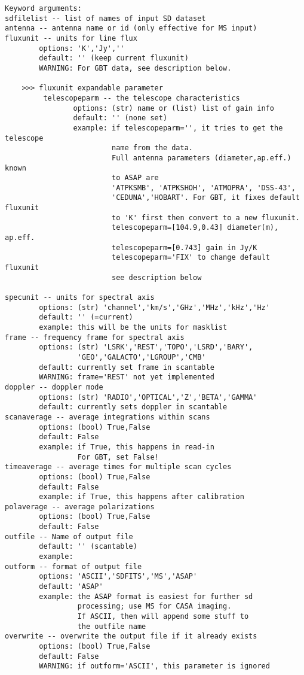 \begin{verbatim}
Keyword arguments:
sdfilelist -- list of names of input SD dataset
antenna -- antenna name or id (only effective for MS input)
fluxunit -- units for line flux
        options: 'K','Jy',''
        default: '' (keep current fluxunit)
        WARNING: For GBT data, see description below.
        
    >>> fluxunit expandable parameter
         telescopeparm -- the telescope characteristics
                options: (str) name or (list) list of gain info
                default: '' (none set)
                example: if telescopeparm='', it tries to get the telescope
                         name from the data.
                         Full antenna parameters (diameter,ap.eff.) known
                         to ASAP are
                         'ATPKSMB', 'ATPKSHOH', 'ATMOPRA', 'DSS-43',
                         'CEDUNA','HOBART'. For GBT, it fixes default fluxunit
                         to 'K' first then convert to a new fluxunit.
                         telescopeparm=[104.9,0.43] diameter(m), ap.eff.
                         telescopeparm=[0.743] gain in Jy/K
                         telescopeparm='FIX' to change default fluxunit
                         see description below

specunit -- units for spectral axis
        options: (str) 'channel','km/s','GHz','MHz','kHz','Hz'
        default: '' (=current)
        example: this will be the units for masklist
frame -- frequency frame for spectral axis
        options: (str) 'LSRK','REST','TOPO','LSRD','BARY',
                 'GEO','GALACTO','LGROUP','CMB'
        default: currently set frame in scantable
        WARNING: frame='REST' not yet implemented
doppler -- doppler mode
        options: (str) 'RADIO','OPTICAL','Z','BETA','GAMMA'
        default: currently sets doppler in scantable
scanaverage -- average integrations within scans
        options: (bool) True,False
        default: False
        example: if True, this happens in read-in
                 For GBT, set False!
timeaverage -- average times for multiple scan cycles
        options: (bool) True,False
        default: False
        example: if True, this happens after calibration
polaverage -- average polarizations
        options: (bool) True,False
        default: False
outfile -- Name of output file
        default: '' (scantable)
        example:
outform -- format of output file
        options: 'ASCII','SDFITS','MS','ASAP'
        default: 'ASAP'
        example: the ASAP format is easiest for further sd
                 processing; use MS for CASA imaging.
                 If ASCII, then will append some stuff to
                 the outfile name
overwrite -- overwrite the output file if it already exists
        options: (bool) True,False
        default: False
        WARNING: if outform='ASCII', this parameter is ignored
\end{verbatim}

